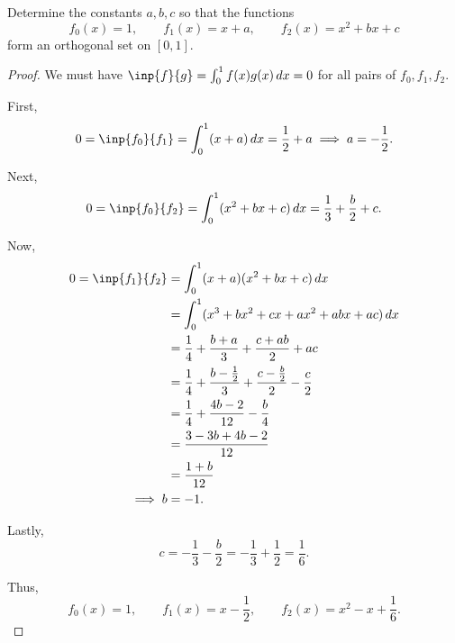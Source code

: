 \documentclass[../hw6]{subfiles}
\begin{document}
\begin{problem}
Determine the constants $a,b,c$ so that the functions  \[
	f_0(x)=1,\qquad f_1(x)=x+a, \qquad f_2(x)=x^2+bx+c
\] form an orthogonal set on $[0,1]$.
\end{problem}
\begin{proof}
	We must have $\inp{f}{g}=\int_{0}^{1} f(x)g(x) \,dx = 0$ for all pairs of $f_0,f_1,f_2$.

	First, \[
		0=\inp{f_0}{f_1} = \int_{0}^{1} (x+a) \,dx = \frac{1}{2}+a \implies a = -\frac{1}{2}
		.\]

	Next, \[
		0=\inp{f_0}{f_2} = \int_{0}^{1} (x^2 + bx + c) \,dx = \frac{1}{3} + \frac{b}{2} + c
		.\]

	Now,
	\begin{align*}
		0 = \inp{f_1}{f_2} & = \int_{0}^{1} (x+a)(x^2+bx+c) \,dx                                               \\
		                   & = \int_{0}^{1} (x^3+bx^2 + cx + ax^2 + abx + ac) \,dx                             \\
		                   & = \frac{1}{4} + \frac{b+a}{3} + \frac{c+ab}{2}+ac                                 \\
		                   & = \frac{1}{4} + \frac{b-\frac{1}{2}}{3} + \frac{c - \frac{b}{2}}{2} - \frac{c}{2} \\
		                   & = \frac{1}{4}+\frac{4b-2}{12}-\frac{b}{4}                                         \\
		                   & = \frac{3-3b+4b-2}{12}                                                            \\
		                   & = \frac{1+b}{12}                                                                  \\
		\implies b         & = -1
		.\end{align*}

	Lastly, \[
		c=-\frac{1}{3}-\frac{b}{2}=-\frac{1}{3}+\frac{1}{2}=\frac{1}{6}
		.\]

	Thus, \[
		f_0(x)=1,\qquad f_1(x)=x-\frac{1}{2}, \qquad f_2(x)=x^2-x+\frac{1}{6}
		.\]
\end{proof}
\end{document}
